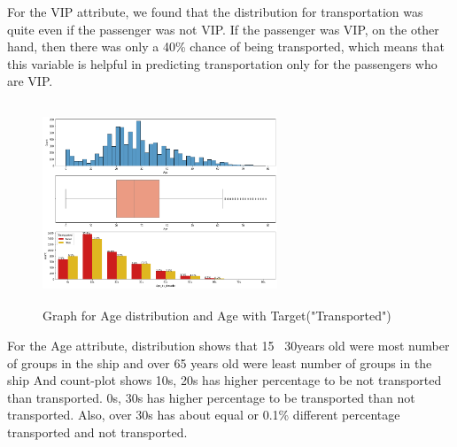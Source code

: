 \documentclass[fleqn,10pt]{SelfArx} %
\begin{document}
For the VIP attribute, we found that the distribution for transportation was quite even if the passenger was not VIP. If the passenger was VIP, on the other hand, then there was only a 40\% chance of being transported, which means that this variable is helpful in predicting transportation only for the passengers who are VIP.
\begin{figure}[H]
    \centering
    \includegraphics[width=7cm, height=6cm]{img/spaceshipwithagedistribution.png}
    \caption{Graph for Age distribution and Age with Target("Transported")}
    \label{fig:my_label}
\end{figure}  
For the Age attribute, distribution shows that 15~ 30years old were most number of groups in the ship and over 65 years old were least number of groups in the ship And count-plot shows 10s, 20s has higher percentage to be not transported than transported. 0s, 30s has higher percentage to be transported than not transported. Also, over 30s has about equal or 0.1\% different percentage transported and not transported. 
\end{document}
